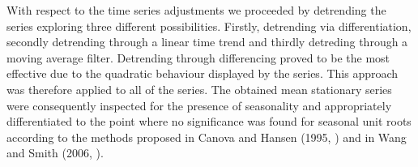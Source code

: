 With respect to the time series adjustments we proceeded by detrending the series exploring three
different possibilities. Firstly, detrending via differentiation, secondly detrending through a
linear time trend and thirdly detreding through a moving average filter. Detrending through differencing
proved to be the most effective due to the quadratic behaviour displayed by
the series. This approach was therefore applied to all of the series.
The obtained mean stationary series were consequently inspected for the presence of seasonality and appropriately
differentiated to the point where no significance was found for seasonal unit roots according to the methods
proposed in Canova and Hansen (1995, \cite{CanovaHansen}) and in Wang and Smith (2006, \cite{WangSmith}).
